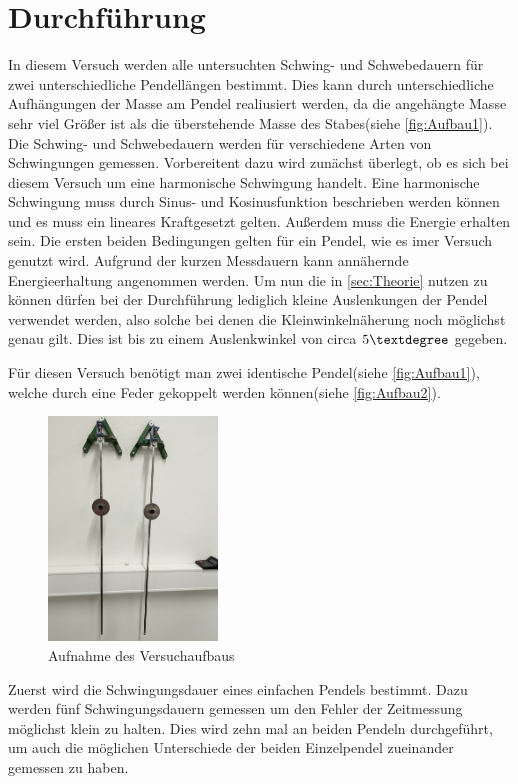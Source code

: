 \section{Durchführung}
\label{sec:Durchführung}
In diesem Versuch werden alle untersuchten Schwing- und Schwebedauern für zwei unterschiedliche Pendellängen bestimmt. Dies kann durch unterschiedliche Aufhängungen der Masse am 
Pendel realiusiert werden, da die angehängte Masse sehr viel Größer ist als die überstehende Masse des Stabes(siehe \autoref{fig:Aufbau1}).
Die Schwing- und Schwebedauern werden für verschiedene Arten von Schwingungen gemessen. Vorbereitent dazu wird zunächst überlegt, ob es sich bei diesem Versuch um eine 
harmonische Schwingung handelt. Eine harmonische Schwingung muss durch  Sinus- und Kosinusfunktion beschrieben werden können und es muss ein lineares Kraftgesetzt gelten.
Außerdem muss die Energie erhalten sein. Die ersten beiden Bedingungen gelten für ein Pendel, wie es imer Versuch genutzt wird. Aufgrund der kurzen Messdauern kann annähernde 
Energieerhaltung angenommen werden. Um nun die in \autoref{sec:Theorie} nutzen zu können dürfen bei der Durchführung lediglich kleine Auslenkungen der Pendel verwendet werden, 
also solche bei denen die Kleinwinkelnäherung noch möglichst genau gilt. Dies ist bis zu einem Auslenkwinkel von circa $5\textdegree$ gegeben. 


Für diesen Versuch benötigt man zwei identische Pendel(siehe \autoref{fig:Aufbau1}), welche durch eine Feder gekoppelt werden können(siehe \autoref{fig:Aufbau2}).
\begin{figure}
    \centering
    \includegraphics[width=0.4\textwidth]{content/Einzelpendel.jpg}
	\caption{Aufnahme des Versuchaufbaus}
	\label{fig:Aufbau1}
\end{figure}
Zuerst wird die Schwingungsdauer eines einfachen Pendels bestimmt. Dazu werden fünf Schwingungsdauern gemessen um den Fehler der Zeitmessung möglichst klein zu halten.
Dies wird zehn mal an beiden Pendeln durchgeführt, um auch die möglichen Unterschiede der beiden Einzelpendel zueinander gemessen zu haben. 



